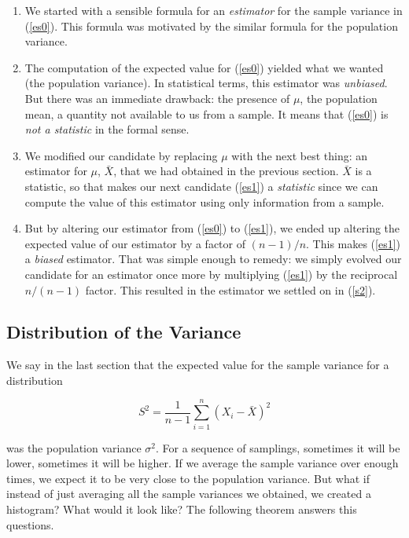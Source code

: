 \documentclass[]{article}
\begin{document}
\begin{enumerate}

\item We started with a sensible formula for an 
   \emph{estimator} for the sample variance in 
   (\ref{es0}).  This formula was motivated by
   the similar formula for the population variance.

\item The computation of the expected value for (\ref{es0})
   yielded what we wanted (the population variance).
   In statistical terms, this estimator was \emph{unbiased}.
   But there was an immediate drawback: the presence of $\mu$,
   the population mean,
   a quantity not available to us from a sample.  It means
   that (\ref{es0}) is \emph{not a statistic} in the formal sense.

\item We modified our candidate by replacing $\mu$ with the
   next best thing: an estimator for $\mu$, $\bar{X}$, that
   we had obtained in the previous section.  $\bar{X}$ is
   a statistic, so that makes our next candidate (\ref{es1})
   a \emph{statistic} since we can compute the value of this
   estimator using only information from a sample.

\item But by altering our estimator from (\ref{es0}) to
   (\ref{es1}), we ended up altering the expected value
   of our estimator by a factor of $(n-1)/n$.  This makes
   (\ref{es1}) a \emph{biased} estimator.  That
   was simple enough to remedy: we simply evolved our
   candidate for an estimator once more by multiplying
   (\ref{es1}) by the reciprocal $n/(n-1)$ factor.
   This resulted in the estimator we settled on in
   (\ref{s2}).

\end{enumerate}

\subsection{Distribution of the Variance}

We say in the last section that the expected value for
the sample variance for a distribution

$$
S^2 = \frac{1}{n-1}\sum_{i=1}^n (X_i - \bar{X})^2
$$

was the population variance $\sigma^2$.  For a sequence
of samplings, sometimes it will be lower, sometimes it
will be higher.  If we average the sample variance over
enough times, we expect it to be very close to the 
population variance.  But what if instead of just averaging
all the sample variances we obtained, we created a histogram?
What would it look like?  The following theorem answers
this questions.
\end{document}
